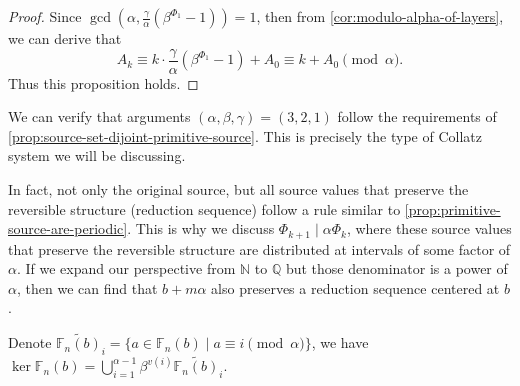 \begin{proof}
    Since $\gcd(\alpha, \frac{\gamma}{\alpha}(\beta^{\Phi_1} - 1)) = 1$, then from \cref{cor:modulo-alpha-of-layers}, we can derive that
    \[ A_k \equiv k\cdot\frac{\gamma}{\alpha}(\beta^{\Phi_1} - 1) + A_0 \equiv k + A_0 \pmod{\alpha}. \]
    Thus this proposition holds.
\end{proof}
We can  verify that arguments $(\alpha, \beta, \gamma) = (3,2,1)$ follow the requirements of \cref{prop:source-set-dijoint-primitive-source}. This is precisely the type of Collatz system we will be discussing.

In fact, not only the original source, but all source values that preserve the reversible structure (reduction sequence) follow a rule similar to \cref{prop:primitive-source-are-periodic}. This is why we discuss $\Phi_{k+1} \mid \alpha\Phi_{k}$, where these source values that preserve the reversible structure are distributed at intervals of some factor of $\alpha$. If we expand our perspective from $\mathbb{N}$ to $\mathbb{Q}$ but those denominator is a power of $\alpha$, then we can find that $b + m\alpha$ also preserves a reduction sequence centered at $b$.
\begin{theorem}
    Denote $\widetilde{\mathbb{F}_{n}(b)}_{i} = \{a\in\mathbb{F}_{n}(b) \mid a\equiv i\pmod{\alpha}\}$, we have
    $\ker \mathbb{F}_{n}(b) = \bigcup_{i=1}^{\alpha - 1}\beta^{v(i)}\widetilde{\mathbb{F}_{n}(b)}_{i}$.
\end{theorem}
